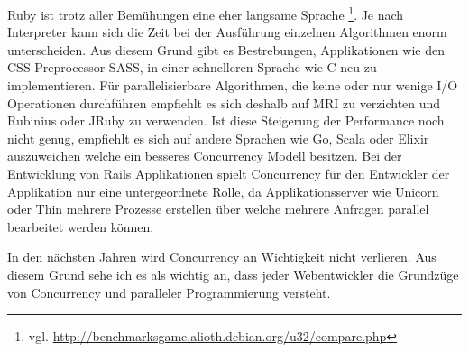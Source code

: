 Ruby ist trotz aller Bemühungen eine eher langsame Sprache \footnote{vgl. \url{http://benchmarksgame.alioth.debian.org/u32/compare.php}}. Je nach Interpreter kann sich die Zeit bei der Ausführung einzelnen Algorithmen enorm unterscheiden. Aus diesem Grund gibt es Bestrebungen, Applikationen wie den CSS Preprocessor SASS, in einer schnelleren Sprache wie C neu zu implementieren. Für parallelisierbare Algorithmen, die keine oder nur wenige I/O Operationen durchführen empfiehlt es sich deshalb auf MRI zu verzichten und Rubinius oder JRuby zu verwenden. Ist diese Steigerung der Performance noch nicht genug, empfiehlt es sich auf andere Sprachen wie Go, Scala oder Elixir auszuweichen welche ein besseres Concurrency Modell besitzen. Bei der Entwicklung von Rails Applikationen spielt Concurrency für den Entwickler der Applikation nur eine untergeordnete Rolle, da Applikationsserver wie Unicorn oder Thin mehrere Prozesse erstellen über welche mehrere Anfragen parallel bearbeitet werden können.

In den nächsten Jahren wird Concurrency an Wichtigkeit nicht verlieren. Aus diesem Grund sehe ich es als wichtig an, dass jeder Webentwickler die Grundzüge von Concurrency und paralleler Programmierung versteht.